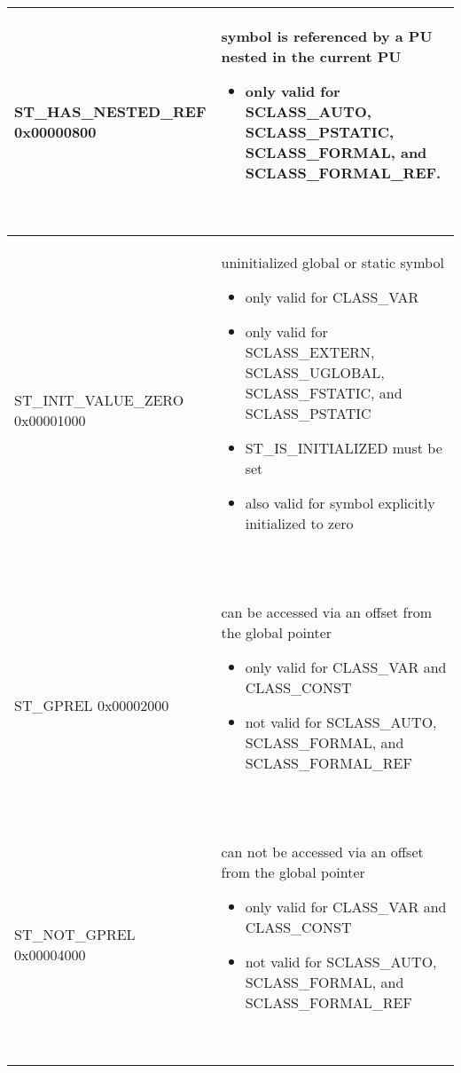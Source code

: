 \begin{longtable}{|p{2in}|p{4in}|}
\index{ST\_HAS\_NESTED\_REF}%
ST\_HAS\_NESTED\_REF 0x00000800 & 
\begin{minipage}{4in}
\flushleft
symbol is referenced by a
\index{PU}%
PU nested in the current
\index{PU}%
PU
\begin{itemize}
\item  only valid for SCLASS\_AUTO, SCLASS\_PSTATIC, SCLASS\_FORMAL, and SCLASS\_FORMAL\_REF.
\end{itemize}
~
\end{minipage}\\\hline

\index{ST\_INIT\_VALUE\_ZERO}%
ST\_INIT\_VALUE\_ZERO 0x00001000 &
\begin{minipage}{4in}
\flushleft
uninitialized global or static symbol
\begin{itemize}
\item only valid for
\index{CLASS\_VAR}%
CLASS\_VAR
\item  only valid for
SCLASS\_EXTERN, SCLASS\_UGLOBAL, SCLASS\_FSTATIC, and
\index{SCLASS\_PSTATIC}%
SCLASS\_PSTATIC
\item
\index{ST\_IS\_INITIALIZED}%
ST\_IS\_INITIALIZED must be set
\item also valid for symbol explicitly initialized to zero
\end{itemize}
~
\end{minipage}\\\hline


\index{ST\_GPREL}%
ST\_GPREL 0x00002000 & 
\begin{minipage}{4in}
\flushleft
can be accessed via an offset from the global pointer
\begin{itemize}
\item only valid for
\index{CLASS\_VAR}%
CLASS\_VAR and
\index{CLASS\_CONST}%
CLASS\_CONST
\item not valid for SCLASS\_AUTO, SCLASS\_FORMAL, and
\index{SCLASS\_FORMAL\_REF}%
SCLASS\_FORMAL\_REF
\end{itemize}
~
\end{minipage}\\\hline

\index{ST\_NOT\_GPREL}%
ST\_NOT\_GPREL 0x00004000 & 
\begin{minipage}{4in}
\flushleft
can not be accessed via an offset from the global pointer
\begin{itemize}
\item only valid for
\index{CLASS\_VAR}%
CLASS\_VAR and
\index{CLASS\_CONST}%
CLASS\_CONST
\item not valid for SCLASS\_AUTO, SCLASS\_FORMAL, and
\index{SCLASS\_FORMAL\_REF}%
SCLASS\_FORMAL\_REF
\end{itemize}
~
\end{minipage}\\\hline


\end{longtable}
